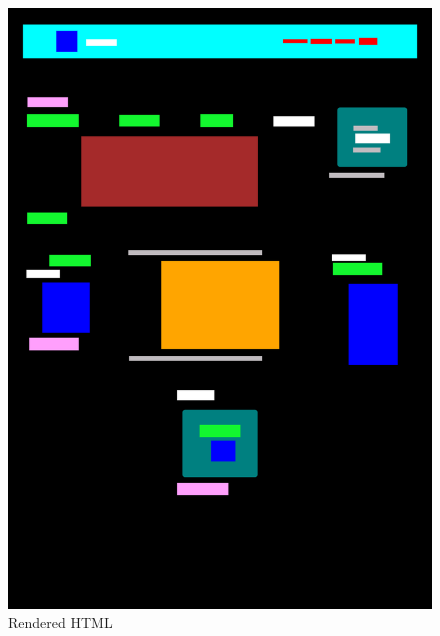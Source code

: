     \begin{figure}[H]
    \centering
    \begin{minipage}{0.35\textwidth}
        \centering
        \includegraphics[width=\linewidth]{images/sample2-rendered.png}
        \caption{Rendered HTML}
        \label{fig:s21}
    \end{minipage}\hfill
    \begin{minipage}{0.35\textwidth}
        \centering

\end{minipage}
\end{figure}

